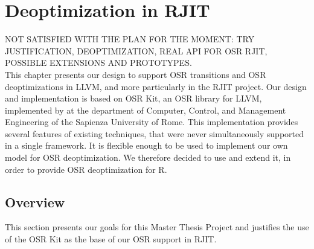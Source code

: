 
\chapter{Deoptimization in RJIT} %

\label{Chapter4} %


\newcommand{\keyword}[1]{\textit{#1}}
\newcommand{\tabhead}[1]{\textbf{#1}}
\newcommand{\code}[1]{\texttt{#1}}
\newcommand{\file}[1]{\texttt{\bfseries#1}}
\newcommand{\option}[1]{\texttt{\itshape#1}}

NOT SATISFIED WITH THE PLAN FOR THE MOMENT: TRY JUSTIFICATION, DEOPTIMIZATION, REAL API FOR OSR RJIT, POSSIBLE EXTENSIONS AND PROTOTYPES.\\

This chapter presents our design to support OSR transitions and OSR deoptimizations in LLVM, and more particularly in the RJIT project.
Our design and implementation is based on OSR Kit\cite{OSRKit, OSRKitGit}, an OSR library for LLVM, implemented by  at the department of Computer, Control, and Management Engineering of the Sapienza University of Rome.
This implementation provides several features of existing techniques, that were never simultaneously supported in a single framework.
It is flexible enough to be used to implement our own model for OSR deoptimization.
We therefore decided to use and extend it, in order to provide OSR deoptimization for R.\\

\section{Overview}
This section presents our goals for this Master Thesis Project and justifies the use of the OSR Kit as the base of our OSR support in RJIT.\\


